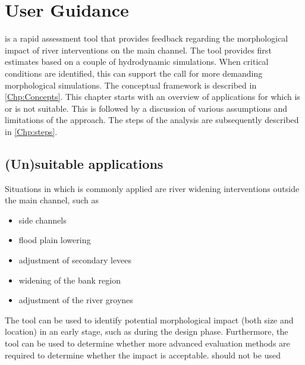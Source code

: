 \chapter{User Guidance}\label{Chp:Guidance}

\dfastmi is a rapid assessment tool that provides feedback regarding the morphological impact of river interventions on the main channel.
The tool provides first estimates based on a couple of hydrodynamic simulations.
When critical conditions are identified, this can support the call for more demanding morphological simulations.
The conceptual framework is described in \autoref{Chp:Concepts}.
This chapter starts with an overview of applications for which \dfmi is or is not suitable.
This is followed by a discussion of various assumptions and limitations of the \dfmi approach.
The steps of the analysis are subsequently described in \autoref{Chp:steps}.

\section{(Un)suitable applications}\label{Sec:SuitableApplications}

Situations in which \dfmi is commonly applied are river widening interventions outside the main channel, such as

\begin{itemize}
\item side channels
\item flood plain lowering
\item adjustment of secondary levees
\item widening of the bank region
\item adjustment of the river groynes
\end{itemize}

The tool can be used to identify potential morphological impact (both size and location) in an early stage, such as during the design phase.
Furthermore, the tool can be used to determine whether more advanced evaluation methods are required to determine whether the impact is acceptable.
\dfmi should not be used

